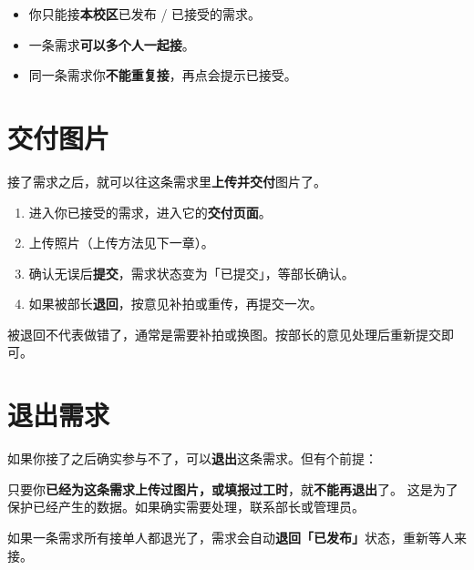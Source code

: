 \documentclass[cn,11pt,green]{elegantbook}
\begin{document}
\begin{itemize}
  \item 你只能接\textbf{本校区}已发布 / 已接受的需求。
  \item 一条需求\textbf{可以多个人一起接}。
  \item 同一条需求你\textbf{不能重复接}，再点会提示已接受。
\end{itemize}

\section{交付图片}

接了需求之后，就可以往这条需求里\textbf{上传并交付}图片了。

\begin{stepbox}[交付一条需求]
  \begin{enumerate}
    \item 进入你已接受的需求，进入它的\textbf{交付页面}。
    \item 上传照片（上传方法见下一章）。
    \item 确认无误后\textbf{提交}，需求状态变为「已提交」，等部长确认。
    \item 如果被部长\textbf{退回}，按意见补拍或重传，再提交一次。
  \end{enumerate}
\end{stepbox}

\begin{tipbox}[被退回是正常的]
  被退回不代表做错了，通常是需要补拍或换图。按部长的意见处理后重新提交即可。
\end{tipbox}

\section{退出需求}

如果你接了之后确实参与不了，可以\textbf{退出}这条需求。但有个前提：

\begin{warnbox}
  只要你\textbf{已经为这条需求上传过图片，或填报过工时}，就\textbf{不能再退出}了。
  这是为了保护已经产生的数据。如果确实需要处理，联系部长或管理员。
\end{warnbox}

\begin{notebox}[最后一个人退出会怎样]
  如果一条需求所有接单人都退光了，需求会自动\textbf{退回「已发布」}状态，重新等人来接。
\end{notebox}

\end{document}
